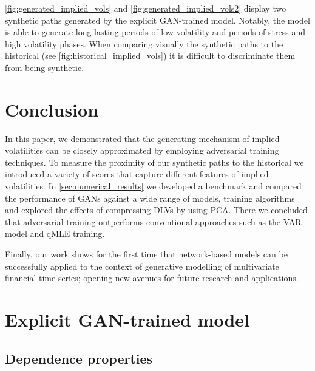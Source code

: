 \documentclass[]{article} %
\begin{document}
\autoref{fig:generated_implied_vols} and \autoref{fig:generated_implied_vols2} display two synthetic paths generated by the explicit GAN-trained model. Notably, the model is able to generate long-lasting periods of low volatility and periods of stress and high volatility phases. When comparing visually the synthetic paths to the historical (see \autoref{fig:historical_implied_vols}) it is difficult to discriminate them from being synthetic. 

\section{Conclusion}
In this paper, we demonstrated that the generating mechanism of implied volatilities can be closely approximated by employing adversarial training techniques. To measure the proximity of our synthetic paths to the historical we introduced a variety of scores that capture different features of implied volatilities. In \autoref{sec:numerical_results} we developed a benchmark and compared the performance of GANs against a wide range of models, training algorithms and explored the effects of compressing DLVs by using PCA.  
There we concluded that adversarial training outperforms conventional approaches such as the VAR model and qMLE training. 

Finally, our work shows for the first time that network-based models can be successfully applied to the context of generative modelling of multivariate financial time series; opening new avenues for future research and applications. 

\newpage



\newpage
\appendix

\renewcommand\thefigure{\thesection.\arabic{figure}} 
\section{Explicit GAN-trained model}
\setcounter{figure}{0}
\label{appendix:gan}
\subsection{Dependence properties}
\end{document}
